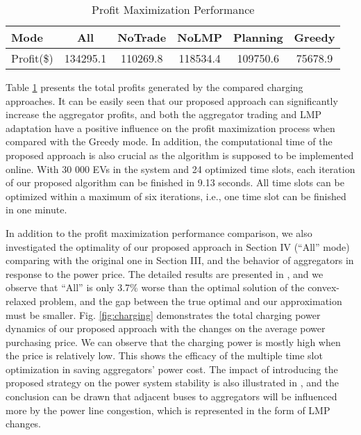 \documentclass[conference]{IEEEtran}
\begin{document}
	\begin{table}
		\caption{Profit Maximization Performance}
        \vspace*{-0.2cm}
		\centering
		\label{tbl:performance}
		\begin{tabular}{l|ccccc}
			\hline
			Mode & All & NoTrade & NoLMP & Planning & Greedy \\ \hline
			Profit(\$) & 134295.1 & 110269.8 & 118534.4 & 109750.6 & 75678.9 \\ \hline
		\end{tabular}
    \vspace*{-0.5cm}
	\end{table}
	
	Table \ref{tbl:performance} presents the total profits generated by the compared charging approaches. It can be easily seen that our proposed approach can significantly increase the aggregator profits, and both the aggregator trading and LMP adaptation have a positive influence on the profit maximization process when compared with the Greedy mode. In addition, the computational time of the proposed approach is also crucial as the algorithm is supposed to be implemented online. With 30 000 EVs in the system and 24 optimized time slots, each iteration of our proposed algorithm can be finished in 9.13 seconds. All time slots can be optimized within a maximum of six iterations, i.e., one time slot can be finished in one minute.



	In addition to the profit maximization performance comparison, we also investigated the optimality of our proposed approach in Section IV (``All'' mode) comparing with the original one in Section III, and the behavior of aggregators in response to the power price. The detailed results are presented in \cite{Yu2015a}, and we observe that ``All'' is only 3.7\% worse than the optimal solution of the convex-relaxed problem, and the gap between the true optimal and our approximation must be smaller. Fig. \ref{fig:charging} demonstrates the total charging power dynamics of our proposed approach with the changes on the average power purchasing price. We can observe that the charging power is mostly high when the price is relatively low. This shows the efficacy of the multiple time slot optimization in saving aggregators' power cost.  The impact of introducing the proposed strategy on the power system stability is also illustrated in \cite{Yu2015a}, and the conclusion can be drawn that adjacent buses to aggregators will be influenced more by the power line congestion, which is represented in the form of LMP changes.
	
\end{document}
